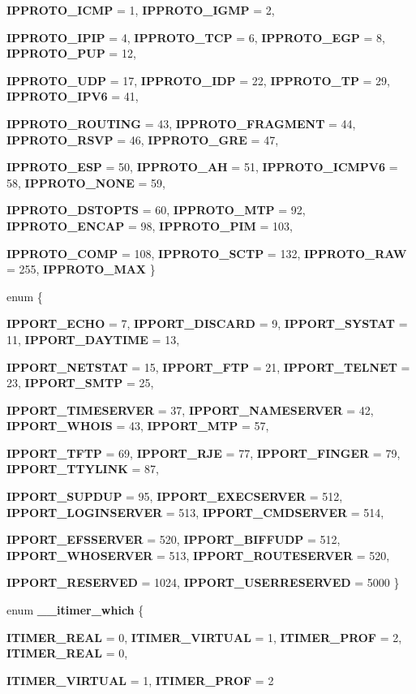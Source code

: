 \begin{DoxyCompactItemize}
{\bf IPPROTO\_\-ICMP} =  1, 
{\bf IPPROTO\_\-IGMP} =  2, 
\par
{\bf IPPROTO\_\-IPIP} =  4, 
{\bf IPPROTO\_\-TCP} =  6, 
{\bf IPPROTO\_\-EGP} =  8, 
{\bf IPPROTO\_\-PUP} =  12, 
\par
{\bf IPPROTO\_\-UDP} =  17, 
{\bf IPPROTO\_\-IDP} =  22, 
{\bf IPPROTO\_\-TP} =  29, 
{\bf IPPROTO\_\-IPV6} =  41, 
\par
{\bf IPPROTO\_\-ROUTING} =  43, 
{\bf IPPROTO\_\-FRAGMENT} =  44, 
{\bf IPPROTO\_\-RSVP} =  46, 
{\bf IPPROTO\_\-GRE} =  47, 
\par
{\bf IPPROTO\_\-ESP} =  50, 
{\bf IPPROTO\_\-AH} =  51, 
{\bf IPPROTO\_\-ICMPV6} =  58, 
{\bf IPPROTO\_\-NONE} =  59, 
\par
{\bf IPPROTO\_\-DSTOPTS} =  60, 
{\bf IPPROTO\_\-MTP} =  92, 
{\bf IPPROTO\_\-ENCAP} =  98, 
{\bf IPPROTO\_\-PIM} =  103, 
\par
{\bf IPPROTO\_\-COMP} =  108, 
{\bf IPPROTO\_\-SCTP} =  132, 
{\bf IPPROTO\_\-RAW} =  255, 
{\bf IPPROTO\_\-MAX}
 \}
\item 
enum \{ \par
{\bf IPPORT\_\-ECHO} =  7, 
{\bf IPPORT\_\-DISCARD} =  9, 
{\bf IPPORT\_\-SYSTAT} =  11, 
{\bf IPPORT\_\-DAYTIME} =  13, 
\par
{\bf IPPORT\_\-NETSTAT} =  15, 
{\bf IPPORT\_\-FTP} =  21, 
{\bf IPPORT\_\-TELNET} =  23, 
{\bf IPPORT\_\-SMTP} =  25, 
\par
{\bf IPPORT\_\-TIMESERVER} =  37, 
{\bf IPPORT\_\-NAMESERVER} =  42, 
{\bf IPPORT\_\-WHOIS} =  43, 
{\bf IPPORT\_\-MTP} =  57, 
\par
{\bf IPPORT\_\-TFTP} =  69, 
{\bf IPPORT\_\-RJE} =  77, 
{\bf IPPORT\_\-FINGER} =  79, 
{\bf IPPORT\_\-TTYLINK} =  87, 
\par
{\bf IPPORT\_\-SUPDUP} =  95, 
{\bf IPPORT\_\-EXECSERVER} =  512, 
{\bf IPPORT\_\-LOGINSERVER} =  513, 
{\bf IPPORT\_\-CMDSERVER} =  514, 
\par
{\bf IPPORT\_\-EFSSERVER} =  520, 
{\bf IPPORT\_\-BIFFUDP} =  512, 
{\bf IPPORT\_\-WHOSERVER} =  513, 
{\bf IPPORT\_\-ROUTESERVER} =  520, 
\par
{\bf IPPORT\_\-RESERVED} =  1024, 
{\bf IPPORT\_\-USERRESERVED} =  5000
 \}
\item 
enum {\bf \_\-\_\-itimer\_\-which} \{ \par
{\bf ITIMER\_\-REAL} =  0, 
{\bf ITIMER\_\-VIRTUAL} =  1, 
{\bf ITIMER\_\-PROF} =  2, 
{\bf ITIMER\_\-REAL} =  0, 
\par
{\bf ITIMER\_\-VIRTUAL} =  1, 
{\bf ITIMER\_\-PROF} =  2

\end{DoxyCompactItemize}
